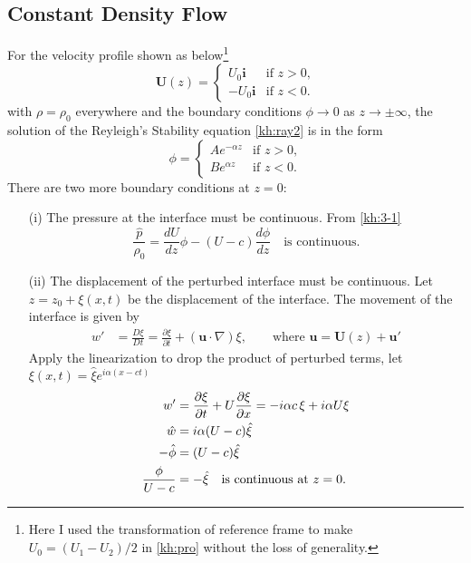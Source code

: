\subsection{Constant Density Flow}
For the velocity profile shown as below\footnote{Here I used the
transformation of reference frame to make $U_0=(U_1-U_2)/2$ in
\eqref{kh:pro} without the loss of generality.}
\begin{equation}\label{kh:bg}
\mathbf{U}(z) =
\begin{cases} U_0 \mathbf{i} &\text{if $z>0$,}\\
-U_0 \mathbf{i} &\text{if $z<0$.}
\end{cases}
\end{equation}
with $\rho=\rho_0$ everywhere and the boundary conditions $\phi \to
0$ as $z \to \pm\infty$, the solution of the Reyleigh's Stability
equation \eqref{kh:ray2} is in the form
\begin{equation*}
\phi =
\begin{cases}
Ae^{-\alpha z} &\text{if $z>0$,}\\
Be^{\alpha z} &\text{if $z<0$.}
\end{cases}
\end{equation*}
\newslide
There are two more boundary conditions at $z=0$:
\begin{enumerate}
  \item[(i)] The pressure at the interface must be continuous. From \eqref{kh:3-1}
  \begin{equation}
  \frac{\hat{p}}{\rho_0}=\frac{dU}{dz}\phi-(U-c)\frac{d\phi}{dz}\quad\text{is continuous.}\label{kh:b1}
  \end{equation}
  \item[(ii)] The displacement of the perturbed interface must be continuous. Let $z=z_0+\xi(x,t)$ be
  the displacement of the interface. The movement of the interface is given
  by
  \begin{align*}
  w'&=\frac{D\xi}{Dt}=\frac{\partial\xi}{\partial
  t}+(\mathbf{u}\cdot\nabla)\xi,\qquad
  \text{where }\mathbf{u}=\mathbf{U}(z)+\mathbf{u}'
  \end{align*}
  \newslide
Apply the linearization to drop the product of perturbed terms,
  let $\xi(x,t)=\hat{\xi}e^{i\alpha(x-ct)}$
  \begin{align}
  w'&=\frac{\partial\xi}{\partial t}+U\frac{\partial\xi}{\partial
  x}=-i\alpha c\,\xi+i\alpha U\xi\notag\\
  \hat{w}&=i\alpha(U-c)\hat{\xi}\notag\\
  -\hat{\phi}&=(U-c)\hat{\xi}\notag\\
  \frac{\phi}{U-c}&=-\hat{\xi}\quad\text{is continuous at $z=0$.}\label{kh:b2}
  \end{align}
\end{enumerate}
